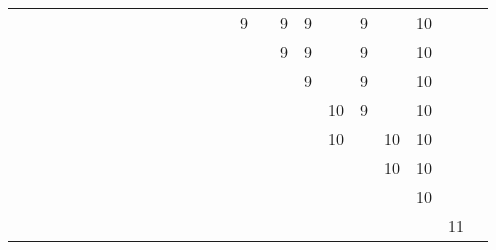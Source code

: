 {\begin{center}
{\begin{tabular}{c c c c c c c c c c c c c c c c c c c c c c c c }
  &    &    &    &    &    &    &    &    &    &    &    &    &    &  9 &    &  9 & 9  &    &  9 &    & 10 &    \\ 
  &    &    &    &    &    &    &    &    &    &    &    &    &    &    &    &  9 & 9  &    &  9 &    & 10 &    \\ 
  &    &    &    &    &    &    &    &    &    &    &    &    &    &    &    &    & 9  &    &  9 &    & 10 &    \\ 
  &    &    &    &    &    &    &    &    &    &    &    &    &    &    &    &    &    & 10 &  9 &    & 10 &    \\
  &    &    &    &    &    &    &    &    &    &    &    &    &    &    &    &    &    & 10 &    & 10 & 10 &    \\ 
  &    &    &    &    &    &    &    &    &    &    &    &    &    &    &    &    &    &    &    & 10 & 10 &    \\  
  &    &    &    &    &    &    &    &    &    &    &    &    &    &    &    &    &    &    &    &    & 10 &    \\
  &    &    &    &    &    &    &    &    &    &    &    &    &    &    &    &    &    &    &    &    &    & 11 \\ 
\end{tabular}}
\end{center}
}
